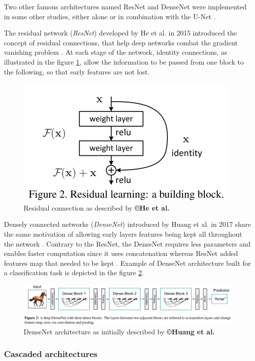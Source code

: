\documentclass[]{article}
\begin{document}
	Two other famous architectures named ResNet and DenseNet were
	implemented in some other studies, either alone or in combination with
	the U-Net \cite{Han2017, Chlebus2018, Bi2017, Kaluva2018, Li2018}.
	
	The residual network (\emph{ResNet}) developed by He et al. in
	2015 introduced the concept of residual connections, that help deep
	networks combat the gradient vanishing problem \cite{He2015}. At each stage of the
	network, identity connections, as illustrated in the figure \ref{ResidualConnection_Fig}, allow the
	information to be passed from one block to the following, so that early
	features are not lost.
	
	\begin{figure}[th!]
		\centering
		\includegraphics[width=0.4\linewidth]{images/image6}
		\caption{Residual connection as described by \textbf{©He et al.} \cite{He2015}}
		\label{ResidualConnection_Fig}
	\end{figure}
	
	Densely connected networks (\emph{DenseNet}) introduced by Huang
	et al. in 2017 share the same motivation of allowing early layers
	features being kept all throughout the network \cite{Huang2017}. Contrary to the ResNet,
	the DenseNet requires less parameters and enables faster computation
	since it uses concatenation whereas ResNet added features map that
	needed to be kept \cite{Huang2017}. Example of DenseNet
	architecture built for a classification task is depicted in the figure \ref{DenseNet_Fig}.
	\begin{figure}[th!]
		\centering
		\includegraphics[width=0.7\linewidth]{images/image32}
		\caption{DenseNet architecture as initially described by \textbf{©Huang et al.} \cite{Huang2017}}
		\label{DenseNet_Fig}
	\end{figure}
	
	
	\subsubsection*{Cascaded architectures}
	
\end{document}

